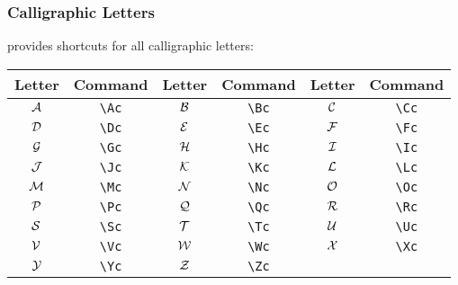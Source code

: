 \subsubsection{Calligraphic Letters}

\asdiasty{} provides shortcuts for all calligraphic letters:

\begin{table}[H]
    \centering
    \begin{tabular}{|cc|cc|cc|}
        \hline
        \textbf{Letter} & \textbf{Command} & \textbf{Letter} & \textbf{Command} & \textbf{Letter} & \textbf{Command} \\ \hline \hline
        $\mathcal{A}$ & \verb|\Ac| & $\mathcal{B}$ & \verb|\Bc| & $\mathcal{C}$ & \verb|\Cc| \\ \hline
        $\mathcal{D}$ & \verb|\Dc| & $\mathcal{E}$ & \verb|\Ec| & $\mathcal{F}$ & \verb|\Fc| \\ \hline
        $\mathcal{G}$ & \verb|\Gc| & $\mathcal{H}$ & \verb|\Hc| & $\mathcal{I}$ & \verb|\Ic| \\ \hline
        $\mathcal{J}$ & \verb|\Jc| & $\mathcal{K}$ & \verb|\Kc| & $\mathcal{L}$ & \verb|\Lc| \\ \hline
        $\mathcal{M}$ & \verb|\Mc| & $\mathcal{N}$ & \verb|\Nc| & $\mathcal{O}$ & \verb|\Oc| \\ \hline
        $\mathcal{P}$ & \verb|\Pc| & $\mathcal{Q}$ & \verb|\Qc| & $\mathcal{R}$ & \verb|\Rc| \\ \hline
        $\mathcal{S}$ & \verb|\Sc| & $\mathcal{T}$ & \verb|\Tc| & $\mathcal{U}$ & \verb|\Uc| \\ \hline
        $\mathcal{V}$ & \verb|\Vc| & $\mathcal{W}$ & \verb|\Wc| & $\mathcal{X}$ & \verb|\Xc| \\ \hline
        $\mathcal{Y}$ & \verb|\Yc| & $\mathcal{Z}$ & \verb|\Zc| &\cellcolor{black} & \cellcolor{black} \\ \hline
    \end{tabular}
\end{table}